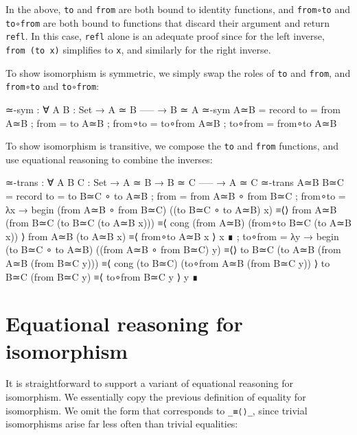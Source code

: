 In the above, \texttt{to} and \texttt{from} are both bound to identity
functions, and \texttt{from∘to} and \texttt{to∘from} are both bound to
functions that discard their argument and return \texttt{refl}. In this
case, \texttt{refl} alone is an adequate proof since for the left
inverse, \texttt{from\ (to\ x)} simplifies to \texttt{x}, and similarly
for the right inverse.

To show isomorphism is symmetric, we simply swap the roles of
\texttt{to} and \texttt{from}, and \texttt{from∘to} and
\texttt{to∘from}:

\begin{fence}
\begin{code}
≃-sym : ∀ {A B : Set}
  → A ≃ B
    -----
  → B ≃ A
≃-sym A≃B =
  record
    { to      = from A≃B
    ; from    = to   A≃B
    ; from∘to = to∘from A≃B
    ; to∘from = from∘to A≃B
    }
\end{code}
\end{fence}

To show isomorphism is transitive, we compose the \texttt{to} and
\texttt{from} functions, and use equational reasoning to combine the
inverses:

\begin{fence}
\begin{code}
≃-trans : ∀ {A B C : Set}
  → A ≃ B
  → B ≃ C
    -----
  → A ≃ C
≃-trans A≃B B≃C =
  record
    { to       = to   B≃C ∘ to   A≃B
    ; from     = from A≃B ∘ from B≃C
    ; from∘to  = λ{x →
        begin
          (from A≃B ∘ from B≃C) ((to B≃C ∘ to A≃B) x)
        ≡⟨⟩
          from A≃B (from B≃C (to B≃C (to A≃B x)))
        ≡⟨ cong (from A≃B) (from∘to B≃C (to A≃B x)) ⟩
          from A≃B (to A≃B x)
        ≡⟨ from∘to A≃B x ⟩
          x
        ∎}
    ; to∘from = λ{y →
        begin
          (to B≃C ∘ to A≃B) ((from A≃B ∘ from B≃C) y)
        ≡⟨⟩
          to B≃C (to A≃B (from A≃B (from B≃C y)))
        ≡⟨ cong (to B≃C) (to∘from A≃B (from B≃C y)) ⟩
          to B≃C (from B≃C y)
        ≡⟨ to∘from B≃C y ⟩
          y
        ∎}
     }
\end{code}
\end{fence}

\hypertarget{equational-reasoning-for-isomorphism}{%
\section{Equational reasoning for
isomorphism}\label{equational-reasoning-for-isomorphism}}

It is straightforward to support a variant of equational reasoning for
isomorphism. We essentially copy the previous definition of equality for
isomorphism. We omit the form that corresponds to \texttt{\_≡⟨⟩\_},
since trivial isomorphisms arise far less often than trivial equalities:

